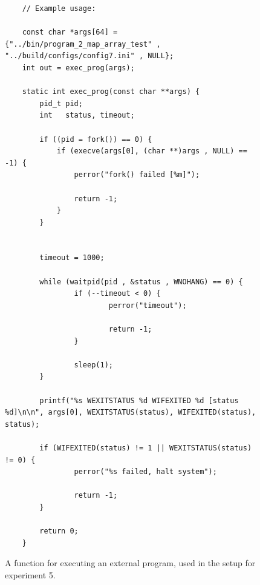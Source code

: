 \begin{figure}
	\begin{lstlisting}
	// Example usage: 

	const char *args[64] = {"../bin/program_2_map_array_test" , "../build/configs/config7.ini" , NULL};
    int out = exec_prog(args);

	static int exec_prog(const char **args) {
	    pid_t pid;
	    int   status, timeout;

	    if ((pid = fork()) == 0) {
	        if (execve(args[0], (char **)args , NULL) == -1) {
	            perror("fork() failed [%m]");

	            return -1;
	        }
	    }


	    timeout = 1000;

	    while (waitpid(pid , &status , WNOHANG) == 0) {
	            if (--timeout < 0) {
	                    perror("timeout");

	                    return -1;
	            }

	            sleep(1);
	    }

	    printf("%s WEXITSTATUS %d WIFEXITED %d [status %d]\n\n", args[0], WEXITSTATUS(status), WIFEXITED(status), status);

	    if (WIFEXITED(status) != 1 || WEXITSTATUS(status) != 0) {
	            perror("%s failed, halt system");

	            return -1;
	    }

	    return 0;
	}
	\end{lstlisting}

	\caption{A function for executing an external program, used in the setup for experiment 5.}
	\label{fig:implementation_execute_external_program}
\end{figure}